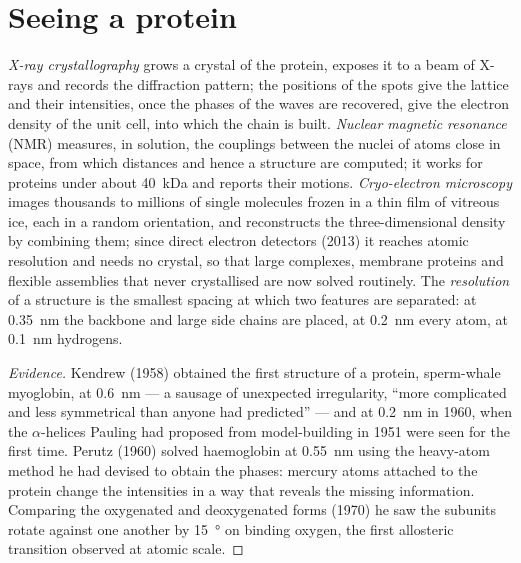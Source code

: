 \section{Seeing a protein}

\begin{definition}\label{def:b3:structural-biology:methods}
\emph{X-ray crystallography} grows a crystal of the protein, exposes
it to a beam of X-rays and records the diffraction pattern; the
positions of the spots give the lattice and their intensities, once
the phases of the waves are recovered, give the electron density of the
unit cell, into which the chain is built. \emph{Nuclear magnetic
resonance} (NMR) measures, in solution, the couplings between the
nuclei of atoms close in space, from which distances and hence a
structure are computed; it works for proteins under about \qty{40}{kDa}
and reports their motions. \emph{Cryo-electron microscopy} images
thousands to millions of single molecules frozen in a thin film of
vitreous ice, each in a random orientation, and reconstructs the
three-dimensional density by combining them; since direct electron
detectors (2013) it reaches atomic resolution and needs no crystal, so
that large complexes, membrane proteins and flexible assemblies that
never crystallised are now solved routinely. The \emph{resolution} of a
structure is the smallest spacing at which two features are separated:
at \qty{0.35}{nm} the backbone and large side chains are placed, at
\qty{0.2}{nm} every atom, at \qty{0.1}{nm} hydrogens.
\end{definition}

\begin{proof}[Evidence]
Kendrew (1958) obtained the first structure of a protein, sperm-whale
myoglobin, at \qty{0.6}{nm} --- a sausage of unexpected irregularity,
``more complicated and less symmetrical than anyone had predicted''
--- and at \qty{0.2}{nm} in 1960, when the $\alpha$-helices Pauling had
proposed from model-building in 1951 were seen for the first time.
Perutz (1960) solved haemoglobin at \qty{0.55}{nm} using the
heavy-atom method he had devised to obtain the phases: mercury atoms
attached to the protein change the intensities in a way that reveals
the missing information. Comparing the oxygenated and deoxygenated
forms (1970) he saw the subunits rotate against one another by
\qty{15}{\degree} on binding oxygen, the first allosteric transition
observed at atomic scale.
\end{proof}

